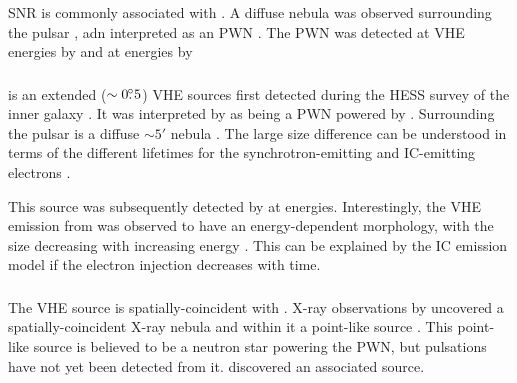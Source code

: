 \subsubsection{\mshfifteenfiftytwo}

\ac{SNR}
\citep[\mshfifteenfiftytwo][]{caswell_1981a_high-resolution-radio} is
commonly associated with  \citep{seward_1982a_x-ray-pulsar}.
A diffuse nebula was observed surrounding the pulsar
\citep{seward_1982a_x-ray-pulsar}, adn interpreted as an \ac{PWN}
\cite{trussoni_1996a_rosat-observations}.  The \ac{PWN} was detected at
\ac{VHE} energies by \cite{aharonian_2005a_discovery-extended} and at
\gev energies by \cite{abdo_2010a_detection-energetic}

\subsubsection{}

 is an extended ($\sim0\mbox{$.\!\!^\circ$}5$) \ac{VHE} sources
first detected during the \ac{HESS} survey of the inner
galaxy \citep{aharonian_2006a_h.e.s.s.-survey}.  It was
interpreted by \cite{aharonian_2005a_possible-association}
as being a \ac{PWN} powered by  \citep[also known
as ,][]{clifton_1992a_high-frequency-survey}.
Surrounding the pulsar is a diffuse $\sim 5'$ nebula
\citep{finley_1996a_morphology-young}.  The large size difference
can be understood in terms of the different lifetimes for
the synchrotron-emitting and \ac{IC}-emitting electrons
\citep{aharonian_2006a_h.e.s.s.-survey}.

This source was subsequently detected by
\cite{grondin_2011a_detection-pulsar} at \gev energies.  Interestingly,
the \ac{VHE} emission from  was observed to have an
energy-dependent morphology, with the size decreasing with increasing
energy \citep{aharonian_2006a_energy-dependent}.  This can be explained
by the \ac{IC} emission model if the electron injection decreases
with time.

\subsubsection{}

The \ac{VHE} source  
\citep{aharonian_2006a_h.e.s.s.-survey}
is spatially-coincident with 
\citep{shaver_1970a_galactic-radio}.  X-ray observations by
\xmmnewton uncovered a spatially-coincident X-ray nebula and within it
a point-like source \cite{funk_2007a_xmm-newton-observations}.
This point-like source is believed to be a neutron star powering the
\ac{PWN}, but pulsations have not yet been detected from it.
\cite{slane_2010_fermi-detection} discovered an associated \gev source.

